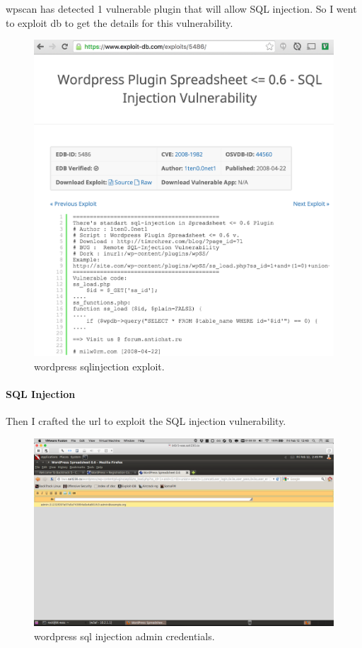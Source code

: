 \documentclass{article}
\begin{document}
\newpage
wpscan has detected 1 vulnerable plugin that will allow SQL injection. So I went
to exploit db to get the details for this vulnerability.

\begin{figure}[h!]
	\includegraphics[width=\linewidth]{images/wp-exploitdb.png}
	\caption{wordpress sqlinjection exploit.}
	\label{fig:wordpress1}
\end{figure}

\newpage
\paragraph{SQL Injection}
Then I crafted the url to exploit the SQL injection vulnerability.

\begin{figure}[h!]
	\includegraphics[width=\linewidth]{images/wp-admin-credentials.png}
	\caption{wordpress sql injection admin credentials.}
	\label{fig:wordpress2}
\end{figure}
\end{document}
